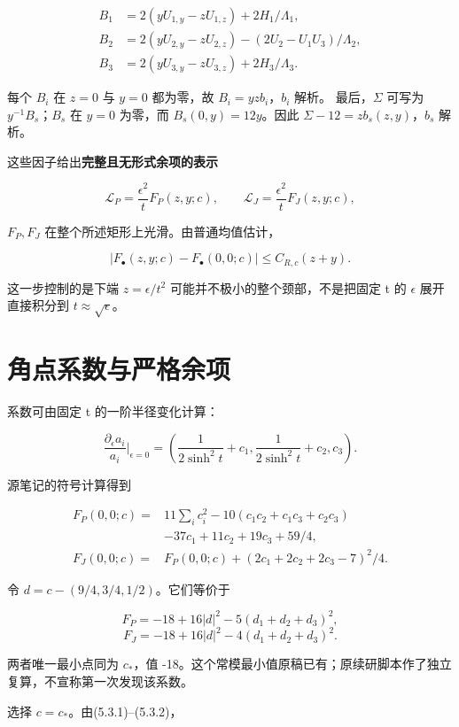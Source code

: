 \documentclass[UTF8,11pt,fontset=none]{ctexart}
\theoremstyle{definition}
\theoremstyle{remark}
\begin{document}
\[
\begin{aligned}
B_1&=2(yU_{1,y}-zU_{1,z})+2H_1/\Lambda_1,\\
B_2&=2(yU_{2,y}-zU_{2,z})-(2U_2-U_1U_3)/\Lambda_2,\\
B_3&=2(yU_{3,y}-zU_{3,z})+2H_3/\Lambda_3.
\end{aligned}
\]

每个 \(B_i\) 在 \(z=0\) 与 \(y=0\) 都为零，故 \(B_i=yz b_i\)，\(b_i\) 解析。 最后，\(\Sigma\) 可写为 \(y^{-1}B_s\)；\(B_s\) 在 \(y=0\) 为零，而 \(B_s(0,y)=12y\)。因此 \(\Sigma -12=z b_s(z,y)\)，\(b_s\) 解析。

这些因子给出\textbf{完整且无形式余项的表示}

\[
\boxed{\mathscr L_P=\frac{\epsilon^2}{t}F_P(z,y;c),\qquad
\mathscr L_J=\frac{\epsilon^2}{t}F_J(z,y;c),}
\tag{5.3.1}
\]

\(F_P,F_J\) 在整个所述矩形上光滑。由普通均值估计，

\[
 |F_\bullet(z,y;c)-F_\bullet(0,0;c)|\le C_{R,c}(z+y).
\tag{5.3.2}
\]

这一步控制的是下端 \(z=\epsilon /t^2\) 可能并不极小的整个颈部，不是把固定 t 的 \(\epsilon\) 展开直接积分到 \(t\approx \sqrt{\epsilon }\)。

\section{角点系数与严格余项}\label{v5-ux89d2ux70b9ux7cfbux6570ux4e0eux4e25ux683cux4f59ux9879}

系数可由固定 t 的一阶半径变化计算：

\[
\frac{\partial_\epsilon a_i}{a_i}\Big|_{\epsilon=0}
=\left(\frac1{2\sinh^2t}+c_1,
\frac1{2\sinh^2t}+c_2,c_3\right).
\]

源笔记的符号计算得到

\[
\begin{aligned}
F_P(0,0;c)={}&11\sum_i c_i^2
 -10(c_1c_2+c_1c_3+c_2c_3)\\
&-37c_1+11c_2+19c_3+59/4,\\
F_J(0,0;c)={}&F_P(0,0;c)+(2c_1+2c_2+2c_3-7)^2/4.
\end{aligned}
\]

令 \(d=c-(9/4,3/4,1/2)\)。它们等价于

\[
F_P=-18+16|d|^2-5(d_1+d_2+d_3)^2,
\] \[
F_J=-18+16|d|^2-4(d_1+d_2+d_3)^2.
\]

两者唯一最小点同为 \(c_*\)，值 -18。这个常模最小值原稿已有；原续研脚本作了独立复算，不宣称第一次发现该系数。

选择 \(c=c_*\)。由(5.3.1)--(5.3.2)，
\end{document}
